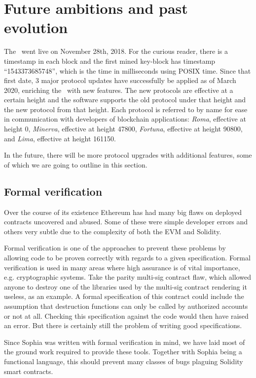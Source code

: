 \section{Future ambitions and past evolution}

The \blockchain\ went live on November 28th, 2018. For the curious reader,
there is a timestamp in each block and the first mined key-block has timestamp
``1543373685748'', which is the time in milliseconds using POSIX time. Since
that first date, 3 major protocol updates have successfully be applied as of March 2020,
enriching the \blockchain\ with new features. The new protocols are effective
at a certain height and the software supports the old protocol under that
height and the new protocol from that height. Each protocol is referred to by
name for ease in communication with developers of blockchain applications:
\textit{Roma}, effective at height 0, \textit{Minerva}, effective at height
47800, \textit{Fortuna}, effective at height 90800, and \textit{Lima},
effective at height 161150.

In the future, there will be more protocol upgrades with additional features,
some of which we are going to outline in this section.

\subsection{Formal verification}

Over the course of its existence Ethereum has had many big flaws on deployed
contracts uncovered and abused. Some of these were simple developer errors and
others very subtle due to the complexity of both the EVM and Solidity.

Formal verification is one of the approaches to prevent these problems by
allowing code to be proven correctly with regards to a given specification.
Formal verification is used in many areas where high assurance is of vital
importance, e.g. cryptographic systems.
Take the parity multi-sig contract flaw, which allowed anyone to destroy one of
the libraries used by the multi-sig contract rendering it useless, as an
example. A formal specification of this contract could include the assumption
that destruction functions can only be called by authorized accounts or not at
all. Checking this specification against the code would then have raised an
error. But there is certainly still the problem of writing good specifications.

Since Sophia was written with formal verification in mind, we have laid most of
the ground work required to provide these tools. Together with Sophia being a
functional language, this should prevent many classes of bugs plaguing Solidity
smart contracts.

